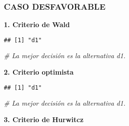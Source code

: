 \documentclass[
]{article}
\newenvironment{Shaded}{\begin{snugshade}}{\end{snugshade}}
\newcommand{\CommentTok}[1]{\textcolor[rgb]{0.56,0.35,0.01}{\textit{#1}}}
\newcommand{\FunctionTok}[1]{\textcolor[rgb]{0.13,0.29,0.53}{\textbf{#1}}}
\newcommand{\NormalTok}[1]{#1}
\newcommand{\OtherTok}[1]{\textcolor[rgb]{0.56,0.35,0.01}{#1}}
\newcommand{\SpecialCharTok}[1]{\textcolor[rgb]{0.81,0.36,0.00}{\textbf{#1}}}
\begin{document}
\subsubsection{CASO DESFAVORABLE}\label{caso-desfavorable}

\textbf{1. Criterio de Wald}

\begin{Shaded}
\end{Shaded}

\begin{verbatim}
## [1] "d1"
\end{verbatim}

\begin{Shaded}
\begin{Highlighting}[]
\CommentTok{\# La mejor decisión es la alternativa d1.}
\end{Highlighting}
\end{Shaded}

\textbf{2. Criterio optimista}

\begin{Shaded}
\end{Shaded}

\begin{verbatim}
## [1] "d1"
\end{verbatim}

\begin{Shaded}
\begin{Highlighting}[]
\CommentTok{\# La mejor decisión es la alternativa d1.}
\end{Highlighting}
\end{Shaded}

\textbf{3. Criterio de Hurwitcz}

\begin{Shaded}
\end{Shaded}
\end{document}
